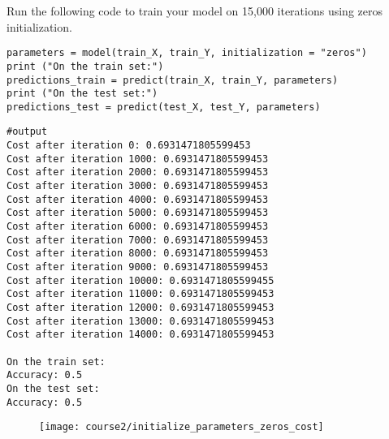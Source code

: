 Run the following code to train your model on 15,000 iterations using zeros initialization.
\begin{verbatim}
parameters = model(train_X, train_Y, initialization = "zeros")
print ("On the train set:")
predictions_train = predict(train_X, train_Y, parameters)
print ("On the test set:")
predictions_test = predict(test_X, test_Y, parameters)
\end{verbatim}
\begin{verbatim}
#output
Cost after iteration 0: 0.6931471805599453
Cost after iteration 1000: 0.6931471805599453
Cost after iteration 2000: 0.6931471805599453
Cost after iteration 3000: 0.6931471805599453
Cost after iteration 4000: 0.6931471805599453
Cost after iteration 5000: 0.6931471805599453
Cost after iteration 6000: 0.6931471805599453
Cost after iteration 7000: 0.6931471805599453
Cost after iteration 8000: 0.6931471805599453
Cost after iteration 9000: 0.6931471805599453
Cost after iteration 10000: 0.6931471805599455
Cost after iteration 11000: 0.6931471805599453
Cost after iteration 12000: 0.6931471805599453
Cost after iteration 13000: 0.6931471805599453
Cost after iteration 14000: 0.6931471805599453

On the train set:
Accuracy: 0.5
On the test set:
Accuracy: 0.5
\end{verbatim}

\begin{figure}[h]
\begin{center}
\texttt{[image: course2/initialize\_parameters\_zeros\_cost]}
\end{center}
\end{figure}

